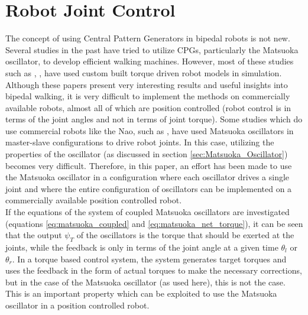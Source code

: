 \documentclass[12pt,twoside]{article}
\theoremstyle{plain}
\theoremstyle{definition}
\theoremstyle{remark}
\newcommand{\forceindent}{\leavevmode{\parindent=2em\indent}}
\begin{document}
\section{Robot Joint Control}
\label{sec:Robot_Joint_Control}
The concept of using Central Pattern Generators in bipedal robots is not new. Several studies in the past have tried to utilize CPGs, particularly the Matsuoka oscillator, to develop efficient walking machines. However, most of these studies such as \cite{Taga1991}, \cite{nakanishi2004learning}, \cite{Ishiguro2003} have used custom built torque driven robot models in simulation. Although these papers present very interesting results and useful insights into bipedal walking, it is very difficult to implement the methods on commercially available robots, almost all of which are position controlled (robot control is in terms of the joint angles and not in terms of joint torque). Some studies which do use commercial robots like the Nao, such as \cite{cristiano2014locomotion}, have used Matsuoka oscillators in master-slave configurations to drive robot joints. In this case, utilizing the properties of the oscillator (as discussed in section \ref{sec:Matsuoka_Oscillator}) becomes very difficult. Therefore, in this paper, an effort has been made to use the Matsuoka oscillator in a configuration where each oscillator drives a single joint and where the entire configuration of oscillators can be implemented on a commercially available position controlled robot.\\
\forceindent If the equations of the system of coupled Matsuoka oscillators are investigated (equations \ref{eq:matsuoka_coupled} and \ref{eq:matsuoka_net_torque}), it can be seen that the output $\psi_T$ of the oscillators is the torque that should be exerted at the joints, while the feedback is only in terms of the joint angle at a given time $\theta_l$ or $\theta_r$. In a torque based control system, the system generates target torques and uses the feedback in the form of actual torques to make the necessary corrections, but in the case of the Matsuoka oscillator (as used here), this is not the case. This is an important property which can be exploited to use the Matsuoka oscillator in a position controlled robot.
\end{document}
